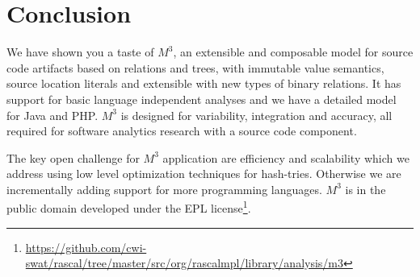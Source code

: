 \documentclass[conference]{IEEEtran}
\newcommand{\mthree}{\ensuremath{M^3}\xspace}
\begin{document}
\section{Conclusion}

We have shown you a taste of \mthree, an extensible and composable model for
source code artifacts based on relations and trees, with immutable value
semantics, source location literals and extensible with new types of binary relations. It has
support for basic language independent analyses and we have a detailed model
for Java and PHP. \mthree is designed for variability, integration and accuracy, all required for software analytics research with a source code component.


The key open challenge for \mthree application are efficiency and scalability which we address using low level optimization techniques for hash-tries. Otherwise we are incrementally adding support for more programming languages. \mthree is in the public domain developed under the EPL license\footnote{\url{https://github.com/cwi-swat/rascal/tree/master/src/org/rascalmpl/library/analysis/m3}}.



\end{document}
